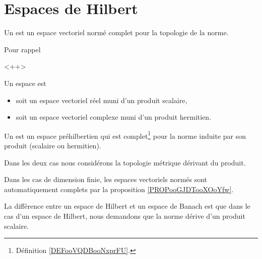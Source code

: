 
\section{Espaces de Hilbert}

\begin{definition}  \label{DefVKuyYpQ}
    Un  est un espace vectoriel normé complet pour la topologie de la norme. 
\end{definition}

\begin{normaltext}
    Pour rappel
\end{normaltext}<++>

\begin{definition}  \label{DefORuBdBN}
    Un espace  est
    \begin{itemize}
        \item soit un espace vectoriel réel muni d'un produit scalaire,
        \item soit un espace vectoriel complexe muni d'un produit hermitien.
    \end{itemize}
    Un  est un espace préhilbertien qui est complet\footnote{Définition \ref{DEFooVQDBooNxprFU}.} pour la norme induite par son produit (scalaire ou hermitien).

    Dans les deux cas nous considérons la topologie métrique dérivant du produit.
\end{definition}

Dans les cas de dimension finie, les espaces vectoriels normés sont automatiquement complets par la proposition \ref{PROPooGJDTooXOoYfw}.

La différence entre un espace de Hilbert et un espace de Banach est que dans le cas d'un espace de Hilbert, nous demandons que la norme dérive d'un produit scalaire.

